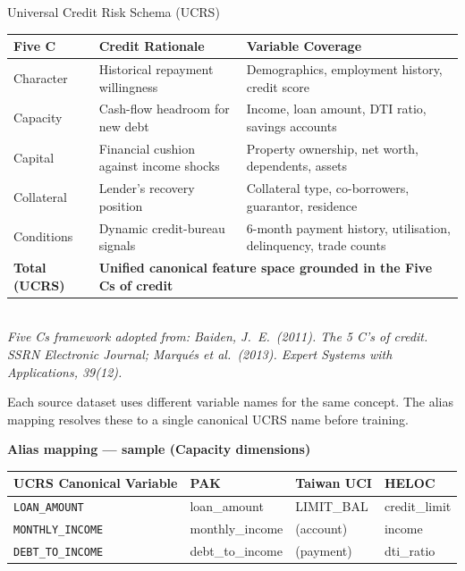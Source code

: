 \documentclass[9pt,aspectratio=169]{beamer}
\begin{document}
\begin{frame}{Universal Credit Risk Schema (UCRS)}
\vspace{-2pt}
\begin{center}
\footnotesize
\begin{tabular}{p{1.6cm} p{4.2cm} p{5.8cm}}
  \toprule
  \textbf{Five C} & \textbf{Credit Rationale} & \textbf{Variable Coverage}\\
  \midrule
  Character   & Historical repayment willingness        & Demographics, employment history, credit score\\
  Capacity    & Cash-flow headroom for new debt         & Income, loan amount, DTI ratio, savings accounts\\
  Capital     & Financial cushion against income shocks & Property ownership, net worth, dependents, assets\\
  Collateral  & Lender's recovery position              & Collateral type, co-borrowers, guarantor, residence\\
  Conditions  & Dynamic credit-bureau signals           & 6-month payment history, utilisation, delinquency, trade counts\\
  \midrule
  \textbf{Total (UCRS)} & \multicolumn{2}{l}{\textbf{Unified canonical feature space grounded in the Five Cs of credit}}\\
  \bottomrule
\end{tabular}\\[3pt]
{\scriptsize\textit{Five Cs framework adopted from: Baiden, J.\ E.\ (2011). The 5 C's of credit. \textit{SSRN Electronic Journal}; Marqu\'{e}s et al.\ (2013). \textit{Expert Systems with Applications}, 39(12).}}
\end{center}
\vspace{4pt}
{\footnotesize Each source dataset uses different variable names for the same concept.
The alias mapping resolves these to a single canonical UCRS name before training.}\\[4pt]
\begin{center}
\footnotesize\textbf{Alias mapping --- sample (Capacity dimensions)}\\[3pt]
\begin{tabular}{llll}
  \toprule
  \textbf{UCRS Canonical Variable} & \textbf{PAK} & \textbf{Taiwan UCI} & \textbf{HELOC}\\
  \midrule
  \texttt{LOAN\_AMOUNT}     & loan\_amount     & LIMIT\_BAL  & credit\_limit\\
  \texttt{MONTHLY\_INCOME}  & monthly\_income  & (account)   & income\\
  \texttt{DEBT\_TO\_INCOME} & debt\_to\_income & (payment)   & dti\_ratio\\
  \bottomrule
\end{tabular}
\end{center}
\end{frame}
\end{document}

